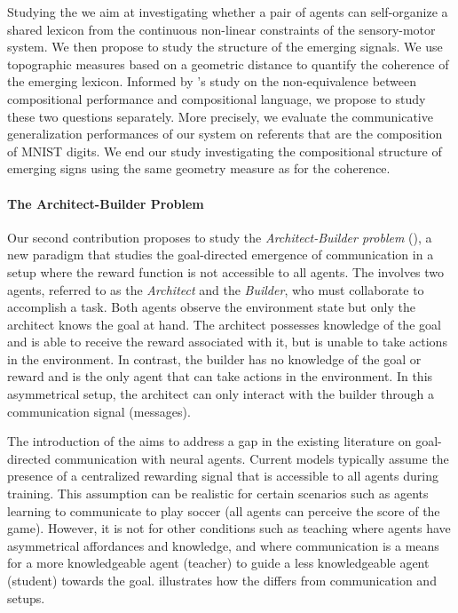 Studying the \greg we aim at investigating whether a pair of agents can self-organize a shared lexicon from the continuous non-linear constraints of the sensory-motor system. We then propose to study the structure of the emerging signals. We use topographic measures based on a geometric distance to quantify the coherence of the emerging lexicon. Informed by \citet{chaabouni2020compositionality}'s study on the non-equivalence between compositional performance and compositional language, we propose to study these two questions separately. More precisely, we evaluate the communicative generalization performances of our system on referents that are the composition of MNIST digits. We end our study investigating the compositional structure of emerging signs using the same geometry measure as for the coherence.

\paragraph{The Architect-Builder Problem}

Our second contribution proposes to study the \textit{Architect-Builder problem} (\abp), a new \ai paradigm that studies the goal-directed emergence of communication in a setup where the reward function is not accessible to all agents. The \abp involves two agents, referred to as the \textit{Architect} and the \textit{Builder}, who must collaborate to accomplish a task. Both agents observe the environment state but only the architect knows the goal at hand. The architect possesses knowledge of the goal and is able to receive the reward associated with it, but is unable to take actions in the environment. In contrast, the builder has no knowledge of the goal or reward and is the only agent that can take actions in the environment. In this asymmetrical setup, the architect can only interact with the builder through a communication signal (messages). 

The introduction of the \abp aims to address a gap in the existing literature on goal-directed communication with neural agents. Current \marl models typically assume the presence of a centralized rewarding signal that is accessible to all agents during training. This assumption can be realistic for certain scenarios such as agents learning to communicate to play soccer (all agents can perceive the score of the game). However, it is not for other conditions such as teaching where agents have asymmetrical affordances and knowledge, and where communication is a means for a more knowledgeable agent (teacher) to guide a less knowledgeable agent (student) towards the goal.  illustrates how the \abp differs from \marl communication and \irl setups. 

